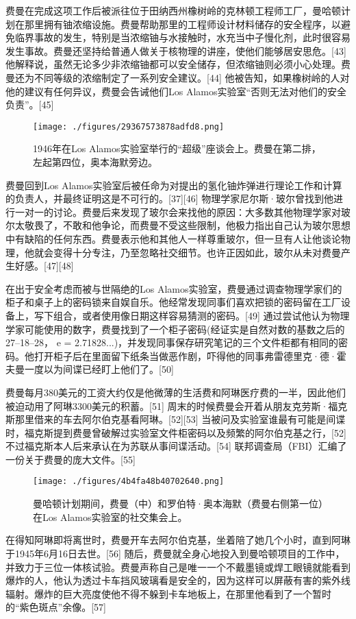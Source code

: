 费曼在完成这项工作后被派往位于田纳西州橡树岭的克林顿工程师工厂，曼哈顿计划在那里拥有铀浓缩设施。费曼帮助那里的工程师设计材料储存的安全程序，以避免临界事故的发生，特别是当浓缩铀与水接触时，水充当中子慢化剂，此时很容易发生事故。费曼还坚持给普通人做关于核物理的讲座，使他们能够居安思危。[43] 他解释说，虽然无论多少非浓缩铀都可以安全储存，但浓缩铀则必须小心处理。费曼还为不同等级的浓缩制定了一系列安全建议。[44] 他被告知，如果橡树岭的人对他的建议有任何异议，费曼会告诫他们Los Alamos实验室“否则无法对他们的安全负责”。[45]
\begin{figure}[ht]
\centering
\texttt{[image: ./figures/29367573878adfd8.png]}
\caption{1946年在Los Alamos实验室举行的“超级”座谈会上。费曼在第二排，左起第四位，奥本海默旁边。} \label{fig_Feynma_2}
\end{figure}
费曼回到Los Alamos实验室后被任命为对提出的氢化铀炸弹进行理论工作和计算的负责人，并最终证明这是不可行的。[37][46] 物理学家尼尔斯·玻尔曾找到他进行一对一的讨论。费曼后来发现了玻尔会来找他的原因：大多数其他物理学家对玻尔太敬畏了，不敢和他争论，而费曼不受这些限制，他极力指出自己认为玻尔思想中有缺陷的任何东西。费曼表示他和其他人一样尊重玻尔，但一旦有人让他谈论物理，他就会变得十分专注，乃至忽略社交细节。也许正因如此，玻尔从未对费曼产生好感。[47][48]

在出于安全考虑而被与世隔绝的Los Alamos实验室，费曼通过调查物理学家们的柜子和桌子上的密码锁来自娱自乐。他经常发现同事们喜欢把锁的密码留在工厂设备上，写下组合，或者使用像日期这样容易猜测的密码。[49] 通过尝试他认为物理学家可能使用的数字，费曼找到了一个柜子密码(经证实是自然对数的基数之后的27–18–28， e = 2.71828...)，并发现同事保存研究笔记的三个文件柜都有相同的密码。他打开柜子后在里面留下纸条当做恶作剧，吓得他的同事弗雷德里克·德·霍夫曼一度以为间谍已经盯上他们了。[50]

费曼每月380美元的工资大约仅是他微薄的生活费和阿琳医疗费的一半，因此他们被迫动用了阿琳3300美元的积蓄。[51] 周末的时候费曼会开着从朋友克劳斯·福克斯那里借来的车去阿尔伯克基看阿琳。[52][53] 当被问及实验室谁最有可能是间谍时，福克斯提到费曼曾破解过实验室文件柜密码以及频繁的阿尔伯克基之行，[52] 不过福克斯本人后来承认在为苏联从事间谍活动。[54] 联邦调查局（FBI）汇编了一份关于费曼的庞大文件。[55]
\begin{figure}[ht]
\centering
\texttt{[image: ./figures/4b4fa48b40702640.png]}
\caption{曼哈顿计划期间，费曼（中）和罗伯特·奥本海默（费曼右侧第一位）在Los Alamos实验室的社交集会上。} \label{fig_Feynma_3}
\end{figure}
在得知阿琳即将离世时，费曼开车去阿尔伯克基，坐着陪了她几个小时，直到阿琳于1945年6月16日去世。[56] 随后，费曼就全身心地投入到曼哈顿项目的工作中，并致力于三位一体核试验。费曼声称自己是唯一一个不戴墨镜或焊工眼镜就能看到爆炸的人，他认为透过卡车挡风玻璃看是安全的，因为这样可以屏蔽有害的紫外线辐射。爆炸的巨大亮度使他不得不躲到卡车地板上，在那里他看到了一个暂时的“紫色斑点”余像。[57]

